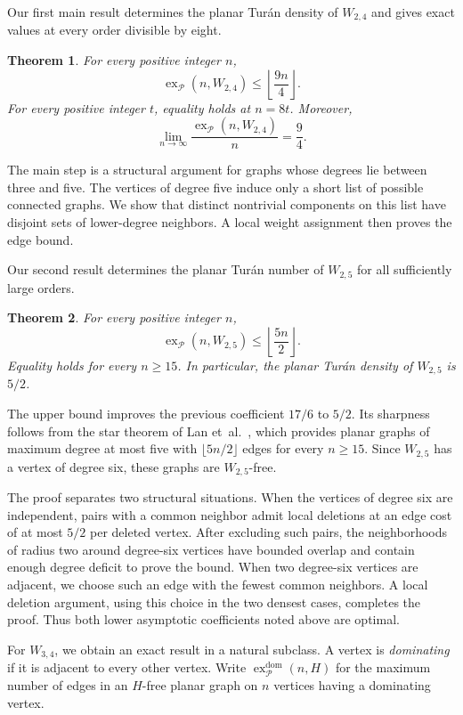 \documentclass[11pt,a4paper]{article}
\newtheorem{theorem}{Theorem}[section]
\theoremstyle{remark}
\newcommand{\ex}{\operatorname{ex}}
\newcommand{\PP}{\mathcal P}
\begin{document}
Our first main result determines the planar Tur\'an density of $W_{2,4}$ and gives exact values at every order divisible by eight.


\begin{theorem}\label{thm:w24}
For every positive integer $n$,
\[
\ex_{\PP}(n,W_{2,4})\le\left\lfloor\frac{9n}{4}\right\rfloor.
\]
For every positive integer $t$, equality holds at $n=8t$. Moreover,
\[
\lim_{n\to\infty}\frac{\ex_{\PP}(n,W_{2,4})}{n}=\frac94.
\]
\end{theorem}


The main step is a structural argument for graphs whose degrees lie between three and five. The vertices of degree five induce only a short list of possible connected graphs. We show that distinct nontrivial components on this list have disjoint sets of lower-degree neighbors. A local weight assignment then proves the edge bound.

Our second result determines the planar Tur\'an number of $W_{2,5}$ for all sufficiently large orders.

\begin{theorem}\label{thm:w25}
For every positive integer $n$,
\[
\ex_{\PP}(n,W_{2,5})\le\left\lfloor\frac{5n}{2}\right\rfloor.
\]
Equality holds for every $n\ge15$. In particular, the planar Tur\'an density of $W_{2,5}$ is $5/2$.
\end{theorem}

The upper bound improves the previous coefficient $17/6$ to $5/2$. Its sharpness follows from the star theorem of Lan et~al.~\cite[Theorem~6]{LanShiSong2019}, which provides planar graphs of maximum degree at most five with $\lfloor5n/2\rfloor$ edges for every $n\ge15$. Since $W_{2,5}$ has a vertex of degree six, these graphs are $W_{2,5}$-free.

The proof separates two structural situations. When the vertices of degree six are independent, pairs with a common neighbor admit local deletions at an edge cost of at most $5/2$ per deleted vertex. After excluding such pairs, the neighborhoods of radius two around degree-six vertices have bounded overlap and contain enough degree deficit to prove the bound. When two degree-six vertices are adjacent, we choose such an edge with the fewest common neighbors. A local deletion argument, using this choice in the two densest cases, completes the proof. Thus both lower asymptotic coefficients noted above are optimal.

For $W_{3,4}$, we obtain an exact result in a natural subclass. A vertex is \emph{dominating} if it is adjacent to every other vertex. Write $\ex^{\mathrm{dom}}_{\PP}(n,H)$ for the maximum number of edges in an $H$-free planar graph on $n$ vertices having a dominating vertex.
\end{document}
